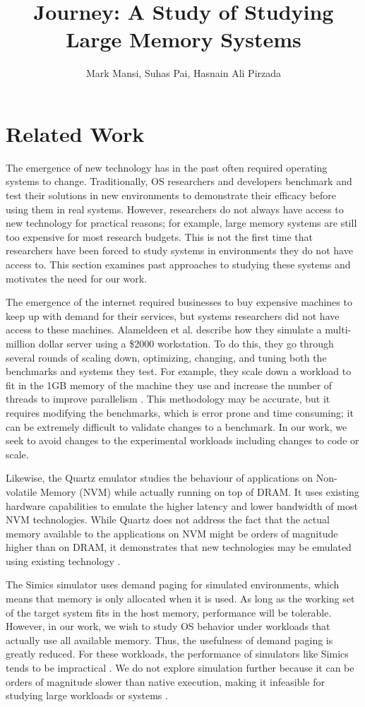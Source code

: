 \documentclass[twocolumn,11pt]{article}
\title{Journey: A Study of Studying Large Memory Systems}
\author{Mark Mansi, Suhas Pai, Hasnain Ali Pirzada}
\date{}
\begin{document}
\maketitle

\section{Related Work}

The emergence of new technology has in the past often required operating systems
to change. Traditionally, OS researchers and developers benchmark and test their
solutions in new environments to demonstrate their efficacy before using them in
real systems. However, researchers do not always have access to new technology
for practical reasons; for example, large memory systems are still too expensive
for most research budgets. This is not the first time that researchers have been
forced to study systems in environments they do not have access to. This section
examines past approaches to studying these systems and motivates the need for
our work.

The emergence of the internet required businesses to buy expensive machines to
keep up with demand for their services, but systems researchers did not have
access to these machines. Alameldeen et al. describe how they simulate a
multi-million dollar server using a \$2000 workstation. To do this, they go
through several rounds of scaling down, optimizing, changing, and tuning both
the benchmarks and systems they test. For example, they scale down a workload to
fit in the 1GB memory of the machine they use and increase the number of threads
to improve parallelism \cite{2kmachine}. This methodology may be accurate, but
it requires modifying the benchmarks, which is error prone and time consuming;
it can be extremely difficult to validate changes to a benchmark. In our work,
we seek to avoid changes to the experimental workloads including changes to code
or scale. 

Likewise, the Quartz emulator studies the behaviour of applications on
Non-volatile Memory (NVM) while actually running on top of DRAM. It uses
existing hardware capabilities to emulate the higher latency and lower bandwidth
of most NVM technologies. While Quartz does not address the fact that the actual
memory available to the applications on NVM might be orders of magnitude higher
than on DRAM, it demonstrates that new technologies may be emulated using
existing technology \cite{quartz}. 

The Simics simulator uses demand paging for simulated environments, which means
that memory is only allocated when it is used. As long as the working set of the
target system fits in the host memory, performance will be tolerable.  However,
in our work, we wish to study OS behavior under workloads that actually use all
available memory. Thus, the usefulness of demand paging is greatly reduced. For
these workloads, the performance of simulators like Simics tends to be
impractical \cite{simics}. We do not explore simulation further because it can
be orders of magnitude slower than native execution, making it infeasible for
studying large workloads or systems \cite{2kmachine}.
\end{document}
